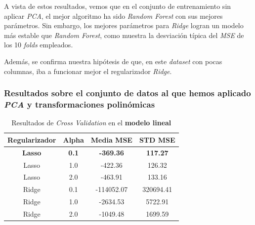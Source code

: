 \documentclass[11pt]{article}
\begin{document}
\begin{table}[H]
  \centering
  \caption{Mejores resultados}
\end{table}

A vista de estos resultados, vemos que en el conjunto de entrenamiento sin aplicar \emph{PCA}, el mejor algoritmo ha sido \emph{Random Forest} con sus mejores parámetros. Sin embargo, los mejores parámetros para \emph{Ridge} logran un modelo más estable que \emph{Random Forest}, como muestra la desviación típica del \emph{MSE} de los 10 \emph{folds} empleados.

Además, se confirma nuestra hipótesis de que, en este \emph{dataset} con pocas columnas, iba a funcionar mejor el regularizador \emph{Ridge}.

\subsubsection{Resultados sobre el conjunto de datos al que hemos aplicado \emph{PCA} y transformaciones polinómicas}

\begin{table}[H]
  \centering
  \begin{tabular}{|c|c|c|c|}
  \hline
    \textbf{Regularizador} & \textbf{Alpha} & \textbf{Media MSE} & \textbf{STD MSE} \\
    \hline
    \textbf{Lasso} & \textbf{0.1} & \textbf{-369.36} & \textbf{117.27}  \\
    Lasso & 1.0 & -422.36 & 126.32  \\
    Lasso & 2.0 & -463.91 & 133.16  \\
    Ridge & 0.1 & -114052.07 & 320694.41 \\
    Ridge & 1.0 & -2634.53   &   5722.91 \\
    Ridge & 2.0 & -1049.48   &   1699.59 \\
    \hline
  \end{tabular}
  \caption{Resultados de \emph{Cross Validation} en el \textbf{modelo lineal}}
\end{table}
\end{document}
